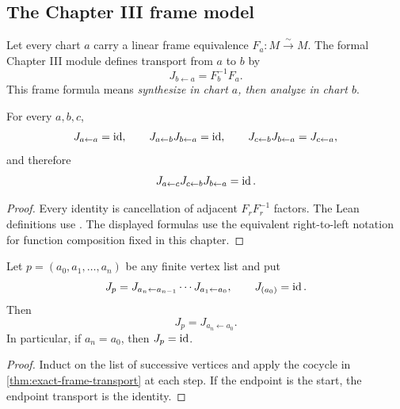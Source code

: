 \subsection{The Chapter III frame model}

Let every chart $a$ carry a linear frame equivalence
$F_a:M\xrightarrow{\sim}M$.  The formal Chapter III module defines transport
from $a$ to $b$ by
\[
J_{b\leftarrow a}=F_b^{-1}F_a.
\]
This frame formula means \emph{synthesize in chart \(a\), then
analyze in chart \(b\)}.

\begin{theorem}
\label{thm:exact-frame-transport}
For every $a,b,c$,
\[
J_{a\leftarrow a}=\operatorname{id},\qquad
J_{a\leftarrow b}J_{b\leftarrow a}=\operatorname{id},\qquad
J_{c\leftarrow b}J_{b\leftarrow a}=J_{c\leftarrow a},
\]
and therefore
\[
J_{a\leftarrow c}J_{c\leftarrow b}J_{b\leftarrow a}=\operatorname{id}.
\]
\end{theorem}

\begin{proof}
Every identity is cancellation of adjacent $F_rF_r^{-1}$ factors.  The Lean
definitions use . The displayed formulas use the
equivalent right-to-left notation for function composition fixed in this chapter.
\end{proof}

\begin{theorem}
\label{thm:exact-path-transport}
Let $p=(a_0,a_1,\ldots,a_n)$ be any finite vertex list and put
\[
J_p
=J_{a_n\leftarrow a_{n-1}}\cdots J_{a_1\leftarrow a_0},
\qquad
J_{(a_0)}=\operatorname{id}.
\]
Then
\[
J_p=J_{a_n\leftarrow a_0}.
\]
In particular, if $a_n=a_0$, then $J_p=\operatorname{id}$.
\end{theorem}

\begin{proof}
Induct on the list of successive vertices and apply the cocycle in
\cref{thm:exact-frame-transport} at each step.  If the endpoint is the start,
the endpoint transport is the identity.
\end{proof}

